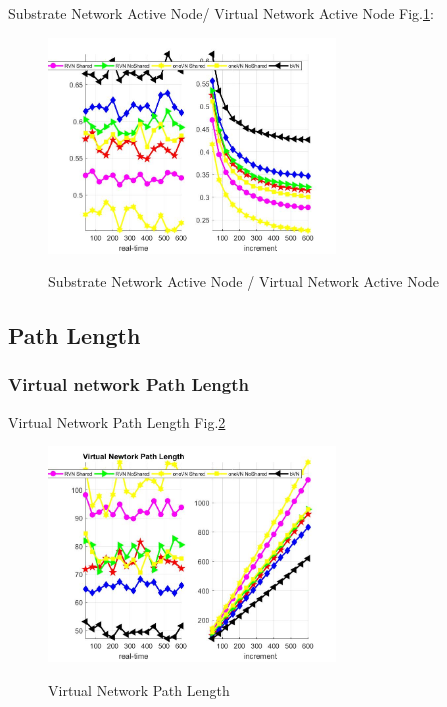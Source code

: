 Substrate Network Active Node/ Virtual Network Active Node Fig.\ref{fig:ActiveNodeSubVir2VirNet}:
\begin{figure}
  \centering
  \includegraphics[width=3in]{Fig/ActiveNodeSubVir2VirNet}\\
  \caption{Substrate Network Active Node / Virtual Network Active Node}\label{fig:ActiveNodeSubVir2VirNet}
\end{figure}

\subsection{Path Length}
\subsubsection{Virtual network Path Length}

Virtual Network Path Length Fig.\ref{fig:PathLengthVirtualNetwork}
\begin{figure}
  \centering
  \includegraphics[width=3in]{Fig/PathLengthVirtualNetwork}\\
  \caption{ Virtual Network Path Length}\label{fig:PathLengthVirtualNetwork}
\end{figure}


